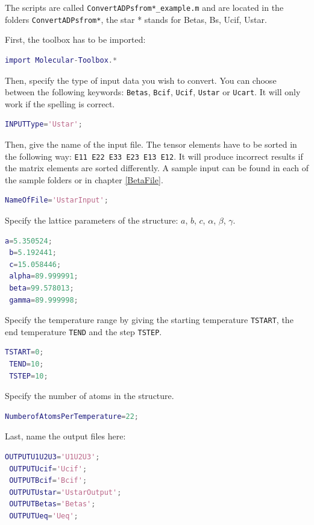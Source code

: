 \documentclass[12pt,a4paper]{article}
\begin{document}
The scripts are called \texttt{ConvertADPsfrom*\_example.m} and are located in the folders \texttt{ConvertADPsfrom*}, the star * stands for Betas, Bs, Ucif, Ustar.

First, the toolbox has to be imported:

\begin{lstlisting}[frame=single,language=Matlab] 
import Molecular-Toolbox.*
\end{lstlisting}

Then, specify the type of input data you wish to convert. You can choose between the following keywords: \texttt{Betas}, \texttt{Bcif}, \texttt{Ucif}, \texttt{Ustar} or \texttt{Ucart}. It will only work if the spelling is correct.

\begin{lstlisting}[frame=single,language=Matlab] 
 INPUTType='Ustar';
\end{lstlisting}

Then, give the name of the input file. The tensor elements have to be sorted in the following way: \texttt{E11 E22 E33 E23 E13 E12}. It will produce incorrect results if the matrix elements are sorted differently. A sample input can be found in each of the sample folders or in chapter \ref{BetaFile}.

\begin{lstlisting}[frame=single,language=Matlab] 
 NameOfFile='UstarInput';
\end{lstlisting}

Specify the lattice parameters of the structure: $a$, $b$, $c$, $\alpha$, $\beta$, $\gamma$.
\begin{lstlisting}[frame=single,language=Matlab,] 
 a=5.350524;
 b=5.192441;
 c=15.058446;
 alpha=89.999991;
 beta=99.578013;
 gamma=89.999998;
\end{lstlisting}

Specify the temperature range by giving the starting temperature \texttt{TSTART}, the end temperature \texttt{TEND} and the step \texttt{TSTEP}.

\begin{lstlisting}[frame=single,language=Matlab] 
 TSTART=0;
 TEND=10;
 TSTEP=10;
\end{lstlisting}
Specify the number of atoms in the structure.
\begin{lstlisting}[frame=single,language=Matlab] 
 NumberofAtomsPerTemperature=22;
\end{lstlisting}

Last, name the output files here:
\begin{lstlisting}[frame=single,language=Matlab] 
 OUTPUTU1U2U3='U1U2U3';
 OUTPUTUcif='Ucif';
 OUTPUTBcif='Bcif';
 OUTPUTUstar='UstarOutput';
 OUTPUTBetas='Betas';
 OUTPUTUeq='Ueq';
\end{lstlisting}
\end{document}
